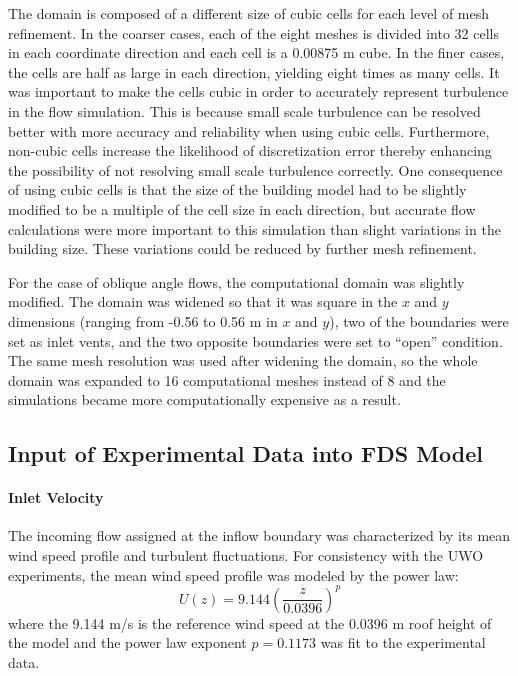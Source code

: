 
The domain is composed of a different size of cubic cells for each level of mesh refinement. In the coarser cases, each of the eight meshes is divided into 32 cells in each coordinate direction and each cell is a 0.00875 m cube. In the finer cases, the cells are half as large in each direction, yielding eight times as many cells. It was important to make the cells cubic in order to accurately represent turbulence in the flow simulation. This is because small scale turbulence can be resolved better with more accuracy and reliability when using cubic cells. Furthermore, non-cubic cells increase the likelihood of discretization error thereby enhancing the possibility of not resolving small scale turbulence correctly. One consequence of using cubic cells is that the size of the building model had to be slightly modified to be a multiple of the cell size in each direction, but accurate flow calculations were more important to this simulation than slight variations in the building size. These variations could be reduced by further mesh refinement.

For the case of oblique angle flows, the computational domain was slightly modified. The domain was widened so that it was square in the $x$ and $y$ dimensions (ranging from -0.56 to 0.56 m in $x$ and $y$), two of the boundaries were set as inlet vents, and the two opposite boundaries were set to ``open'' condition. The same mesh resolution was used after widening the domain, so the whole domain was expanded to 16 computational meshes instead of 8 and the simulations became more computationally expensive as a result.

\subsection{Input of Experimental Data into FDS Model}

\paragraph{Inlet Velocity}
The incoming flow assigned at the inflow boundary was characterized by its mean wind speed profile and turbulent fluctuations. For consistency with the UWO experiments, the mean wind speed profile was modeled by the power law:
\begin{equation}
U(z) = 9.144 \left(\frac{z}{0.0396}\right)^p
\end{equation}
where the 9.144 m/s is the reference wind speed at the 0.0396 m roof height of the model and the power law exponent $p=0.1173$ was fit to the experimental data.

